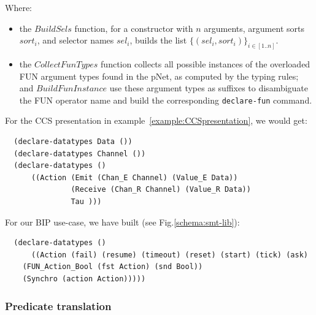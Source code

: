 \documentclass{lncs/llncs}
\begin{document}
\smallskip
Where:
\begin{itemize}
  \item the $BuildSels$ function, for a constructor with $n$ arguments,
argument sorts $sort_i$, and selector names $sel_i$, builds the list
$\{(sel_i, sort_i)\}_{i\in[1..n]}$.
\item the $CollectFunTypes$ function collects all possible instances
  of the overloaded FUN argument types found in the pNet, as computed by the typing
  rules; and $BuildFunInstance$ use these argument types as suffixes
  to disambiguate the FUN operator name and build the corresponding
  \texttt{declare-fun} command.
\end{itemize}


\begin{example}
  For the CCS presentation in example~\ref{example:CCSpresentation}, we would get:
\begin{lstlisting}
  (declare-datatypes Data ())
  (declare-datatypes Channel ())
  (declare-datatypes ()
      ((Action (Emit (Chan_E Channel) (Value_E Data))
               (Receive (Chan_R Channel) (Value_R Data))
               Tau )))
  \end{lstlisting}
\end{example}

\begin{example}
  For our BIP use-case, we have built (see Fig.\ref{schema:smt-lib}):
  \begin{lstlisting}
  (declare-datatypes ()
      ((Action (fail) (resume) (timeout) (reset) (start) (tick) (ask)
    (FUN_Action_Bool (fst Action) (snd Bool))
    (Synchro (action Action)))))
  \end{lstlisting}
\end{example}

 
\subsubsection{Predicate translation}

\end{document}
